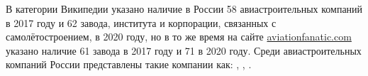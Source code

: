 В категории Википедии  указано наличие в России 58 авиастроительных компаний в 2017 году 
и 62 завода, института и корпорации, связанных с самолётостроением, в 2020 году, 
но в то же время на сайте \href{https://www.aviationfanatic.com/}{aviationfanatic.com} 
указано наличие 61 завода\autocite{count_plants_of_aircrafts} в 2017 году и 71 в 2020 году. 
Среди авиастроительных компаний России 
представлены такие компании как: , , .









